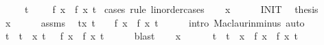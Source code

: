 \begin{isabellebody}
\ \ \ \ {\isacharparenleft}{\kern0pt}\ {\isachardoublequoteopen}{\isasymexists}t{\isachardot}{\kern0pt}\ {\isacharunderscore}{\kern0pt}\ {\isasymand}\ {\isacharunderscore}{\kern0pt}\ {\isasymand}\ f\ x\ {\isacharequal}{\kern0pt}\ {\isacharquery}{\kern0pt}f\ x\ t{\isachardoublequoteclose}{\isacharparenright}{\kern0pt}\isanewline
%
\isadelimproof
%
\endisadelimproof
%
\isatagproof
{}\isamarkupfalse%
\ {\isacharparenleft}{\kern0pt}cases\ rule{\isacharcolon}{\kern0pt}\ linorder{\isacharunderscore}{\kern0pt}cases{\isacharparenright}{\kern0pt}\isanewline
\ \ \isamarkupfalse%
\ {\isachardoublequoteopen}x\ {\isacharequal}{\kern0pt}\ {}{\isachardoublequoteclose}\isanewline
\ \ \isamarkupfalse%
\ INIT{}\ \isamarkupfalse%
\ {\isacharquery}{\kern0pt}thesis\ \isacommand{{\isachardot}{\kern0pt}{\isachardot}{\kern0pt}}\isamarkupfalse%
\isanewline
{}\isamarkupfalse%
\isanewline
\ \ \isamarkupfalse%
\ {\isachardoublequoteopen}x\ {\isacharless}{\kern0pt}\ {}{\isachardoublequoteclose}\isanewline
\ \ \isamarkupfalse%
\ assms\ \isamarkupfalse%
\ {\isachardoublequoteopen}{\isasymexists}t{\isachargreater}{\kern0pt}x{\isachardot}{\kern0pt}\ t\ {\isacharless}{\kern0pt}\ {}\ {\isasymand}\ f\ x\ {\isacharequal}{\kern0pt}\ {\isacharquery}{\kern0pt}f\ x\ t{\isachardoublequoteclose}\isanewline
\ \ \ \ \isamarkupfalse%
\ {\isacharparenleft}{\kern0pt}intro\ Maclaurin{\isacharunderscore}{\kern0pt}minus{\isacharparenright}{\kern0pt}\ auto\isanewline
\ \ \isamarkupfalse%
\ \isamarkupfalse%
\ t\ \ {\isachardoublequoteopen}t\ {\isachargreater}{\kern0pt}\ x{\isachardoublequoteclose}\ {\isachardoublequoteopen}t\ {\isacharless}{\kern0pt}\ {}{\isachardoublequoteclose}\ {\isachardoublequoteopen}f\ x\ {\isacharequal}{\kern0pt}\ {\isacharquery}{\kern0pt}f\ x\ t{\isachardoublequoteclose}\isanewline
\ \ \ \ \isamarkupfalse%
\ blast\isanewline
\ \ \isamarkupfalse%
\ {\isacartoucheopen}x\ {\isacharless}{\kern0pt}\ {}{\isacartoucheclose}\ \isamarkupfalse%
\ {\isachardoublequoteopen}{}\ {\isacharless}{\kern0pt}\ {\isasymbar}t{\isasymbar}\ {\isasymand}\ {\isasymbar}t{\isasymbar}\ {\isacharless}{\kern0pt}\ {\isasymbar}x{\isasymbar}\ {\isasymand}\ f\ x\ {\isacharequal}{\kern0pt}\ {\isacharquery}{\kern0pt}f\ x\ t{\isachardoublequoteclose}\isanewline
\ \ \ \ \isamarkupfalse%

\end{isabellebody}
